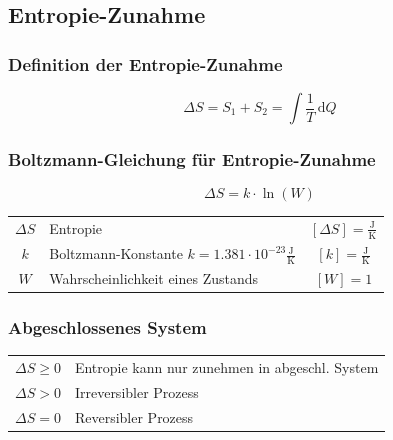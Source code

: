 

\subsection{Entropie-Zunahme}

\subsubsection{Definition der Entropie-Zunahme}

$$ \Delta S = S_1 + S_2 = \int \frac{1}{T} \, \mathrm{d}Q  $$


\subsubsection{Boltzmann-Gleichung für Entropie-Zunahme}

$$ \boxed{ \Delta S = k \cdot \ln(W) }$$



\begin{tabular}{c l c}
	\rule{0pt}{10pt}$\Delta S$ & Entropie & $[\Delta S] = \mathrm{\frac{J}{K}}$ \\
	\rule{0pt}{10pt}$k$ & Boltzmann-Konstante $k = 1.381 \cdot 10^{-23} \mathrm{\frac{J}{K}}$ & $[k] = \mathrm{\frac{J}{K}}$ \\
	$W$ & Wahrscheinlichkeit eines Zustands & $[W] = 1$ \\
\end{tabular}


\subsubsection{Abgeschlossenes System}

\begin{tabular}{ll}
$ \Delta S \geq 0$ & Entropie kann nur zunehmen in abgeschl. System \\

$ \Delta S > 0$ & Irreversibler Prozess \\

$ \Delta S = 0$ & Reversibler Prozess \\
\end{tabular}

